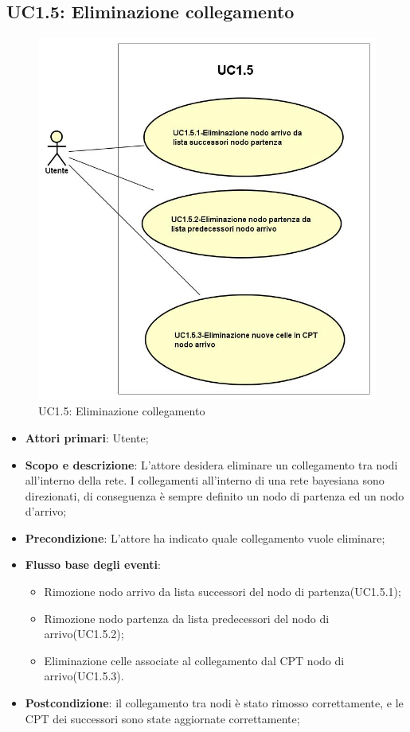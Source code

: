 \subsection{UC1.5: Eliminazione collegamento} 
\begin{figure} [H]
	\centering
	\includegraphics[scale=0.45]{Img/UC1-5} 
	\caption{UC1.5: Eliminazione collegamento} \label{} 
\end{figure} 
\begin{itemize} 
	\item{\textbf{Attori primari}: Utente;} 
	\item{\textbf{Scopo e descrizione}: L'attore desidera eliminare un collegamento tra nodi all'interno della rete. I collegamenti all'interno di una rete bayesiana sono direzionati, di conseguenza è sempre definito un nodo di partenza ed un nodo d'arrivo;} 
	\item{\textbf{Precondizione}: L'attore ha indicato quale collegamento vuole eliminare;} 
	\item{\textbf{Flusso base degli eventi}: } 
	\begin{itemize} 
		\item{Rimozione nodo arrivo da lista successori del nodo di partenza(UC1.5.1);} 
		\item{Rimozione nodo partenza da lista predecessori del nodo di arrivo(UC1.5.2);} 
		\item{Eliminazione celle associate al collegamento dal CPT nodo di arrivo(UC1.5.3).} 
	\end{itemize} 
	\item{\textbf{Postcondizione}: il collegamento tra nodi è stato rimosso correttamente, e le CPT dei successori sono state aggiornate correttamente;} 
\end{itemize} 
